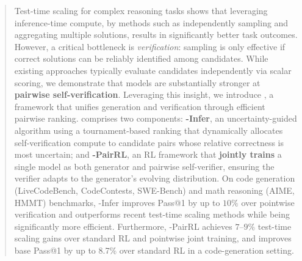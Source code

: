 \begin{abstract}
\vspace{-0.3cm}
Test-time scaling for complex reasoning tasks shows that leveraging inference-time compute, by methods such as independently sampling and aggregating multiple solutions, results in significantly better task outcomes. However, a critical bottleneck is \textit{verification}: sampling is only effective if correct solutions can be reliably identified among candidates. While existing approaches typically evaluate candidates independently via scalar scoring, we demonstrate that models are substantially stronger at \textbf{pairwise self-verification}. Leveraging this insight, we introduce \textbf{\method{}}, a framework that unifies generation and verification through efficient pairwise ranking. \method{} comprises two components: \textbf{\method{}-Infer}, an uncertainty-guided algorithm using a tournament-based ranking that dynamically allocates self-verification compute to candidate pairs whose relative correctness is most uncertain; and \textbf{\method{}-PairRL}, an RL framework that \textbf{jointly trains} a single model as both generator and pairwise self-verifier, ensuring the verifier adapts to the generator's evolving distribution. On code generation (LiveCodeBench, CodeContests, SWE-Bench) and math reasoning (AIME, HMMT) benchmarks, \method{}-Infer improves Pass@1 by up to $10\%$ over pointwise verification and outperforms recent test-time scaling methods while being significantly more efficient. Furthermore, \method{}-PairRL achieves $7$--$9\%$ test-time scaling gains over standard RL and pointwise joint training, and improves base Pass@1 by up to 8.7\% over standard RL in a code-generation setting.
\end{abstract}
